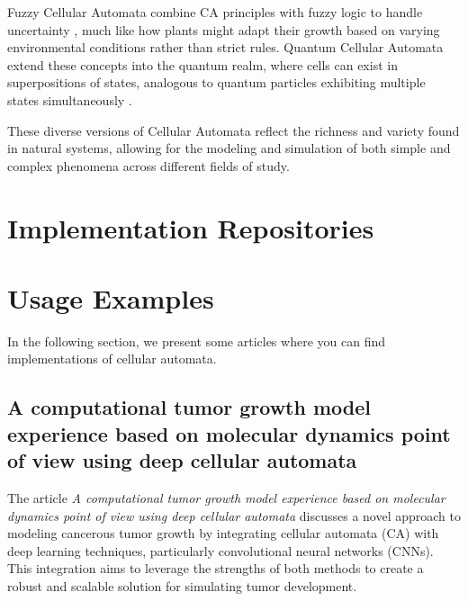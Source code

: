 \documentclass[9pt,a4paper,twoside]{tau-class/tau}
\begin{document}
Fuzzy Cellular Automata combine CA principles with fuzzy logic to handle uncertainty \cite{pedrycz2010}, much like how plants might adapt their growth based on varying environmental conditions rather than strict rules. Quantum Cellular Automata extend these concepts into the quantum realm, where cells can exist in superpositions of states, analogous to quantum particles exhibiting multiple states simultaneously \cite{brennen2003}.

These diverse versions of Cellular Automata reflect the richness and variety found in natural systems, allowing for the modeling and simulation of both simple and complex phenomena across different fields of study.

\section{Implementation Repositories}



\section{Usage Examples}
In the following section, we present some articles where you can find implementations of cellular automata.

\subsection{ A computational tumor growth model experience based on molecular dynamics point of view using deep cellular automata }

The article \textit{A computational tumor growth model experience based on molecular dynamics point of view using deep cellular automata} discusses a novel approach to modeling cancerous tumor growth by integrating cellular automata (CA) with deep learning techniques, particularly convolutional neural networks (CNNs). This integration aims to leverage the strengths of both methods to create a robust and scalable solution for simulating tumor development.\cite{MATIN2024102752}
\end{document}
